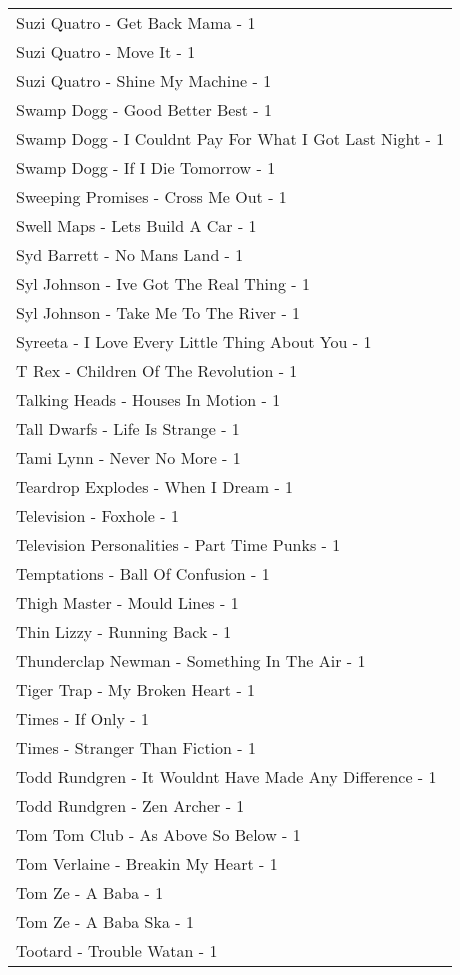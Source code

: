 \documentclass[
]{article}
\begin{document}
\begin{longtable}{l}
Suzi Quatro - Get Back Mama - 1 \\ 
Suzi Quatro - Move It - 1 \\ 
Suzi Quatro - Shine My Machine - 1 \\ 
Swamp Dogg - Good Better Best - 1 \\ 
Swamp Dogg - I Couldnt Pay For What I Got Last Night - 1 \\ 
Swamp Dogg - If I Die Tomorrow - 1 \\ 
Sweeping Promises - Cross Me Out - 1 \\ 
Swell Maps - Lets Build A Car - 1 \\ 
Syd Barrett - No Mans Land - 1 \\ 
Syl Johnson - Ive Got The Real Thing - 1 \\ 
Syl Johnson - Take Me To The River - 1 \\ 
Syreeta - I Love Every Little Thing About You - 1 \\ 
T Rex - Children Of The Revolution - 1 \\ 
Talking Heads - Houses In Motion - 1 \\ 
Tall Dwarfs - Life Is Strange - 1 \\ 
Tami Lynn - Never No More - 1 \\ 
Teardrop Explodes - When I Dream - 1 \\ 
Television - Foxhole - 1 \\ 
Television Personalities - Part Time Punks - 1 \\ 
Temptations - Ball Of Confusion - 1 \\ 
Thigh Master - Mould Lines - 1 \\ 
Thin Lizzy - Running Back - 1 \\ 
Thunderclap Newman - Something In The Air - 1 \\ 
Tiger Trap - My Broken Heart - 1 \\ 
Times - If Only - 1 \\ 
Times - Stranger Than Fiction - 1 \\ 
Todd Rundgren - It Wouldnt Have Made Any Difference - 1 \\ 
Todd Rundgren - Zen Archer - 1 \\ 
Tom Tom Club - As Above So Below - 1 \\ 
Tom Verlaine - Breakin My Heart - 1 \\ 
Tom Ze - A Baba - 1 \\ 
Tom Ze - A Baba Ska - 1 \\ 
Tootard - Trouble Watan - 1 \\ 

\end{longtable}
\end{document}
